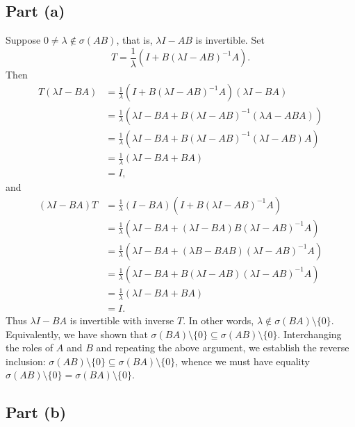 \documentclass[11pt]{article}
\theoremstyle{thmstyle}
\theoremstyle{defstyle}
\begin{document}
\subsection{Part (a)}

Suppose $0\ne\lambda\notin \sigma(AB)$, that is, $\lambda I - AB$ is invertible. Set 
\begin{equation*}
    T = \frac{1}{\lambda}\left(I + B\left(\lambda I - AB\right)^{-1}A\right).
\end{equation*}
Then 
\begin{align*}
    T(\lambda I - BA) &= \frac{1}{\lambda}\left(I + B(\lambda I - AB)^{-1}A\right)(\lambda I - BA)\\
    &= \frac{1}{\lambda}\left(\lambda I - BA + B(\lambda I - AB)^{-1}\left(\lambda A - ABA\right)\right)\\
    &=\frac{1}{\lambda}\left(\lambda I - BA + B(\lambda I - AB)^{-1}\left(\lambda I - AB\right)A\right)\\
    &= \frac{1}{\lambda}\left(\lambda I - BA + BA\right)\\
    &= I,
\end{align*}
and 
\begin{align*}
    (\lambda I - BA)T &= \frac{1}{\lambda}(I - BA)\left(I + B(\lambda I - AB)^{-1}A\right)\\
    &= \frac{1}{\lambda}\left(\lambda I - BA + (\lambda I - BA)B(\lambda I - AB)^{-1}A\right)\\
    &= \frac{1}{\lambda}\left(\lambda I - BA + (\lambda B - BAB)(\lambda I - AB)^{-1}A\right)\\
    &= \frac{1}{\lambda}\left(\lambda I - BA + B(\lambda I - AB)(\lambda I - AB)^{-1}A\right)\\
    &= \frac{1}{\lambda}\left(\lambda I - BA + BA\right)\\
    &= I.
\end{align*}
Thus $\lambda I - BA$ is invertible with inverse $T$. In other words, $\lambda\notin\sigma(BA)\setminus\{0\}$. Equivalently, we have shown that $\sigma(BA)\setminus\{0\}\subseteq\sigma(AB)\setminus\{0\}$. Interchanging the roles of $A$ and $B$ and repeating the above argument, we establish the reverse inclusion: $\sigma(AB)\setminus\{0\}\subseteq\sigma(BA)\setminus\{0\}$, whence we must have equality $\sigma(AB)\setminus\{0\} = \sigma(BA)\setminus\{0\}$.

\subsection{Part (b)}
\end{document}
